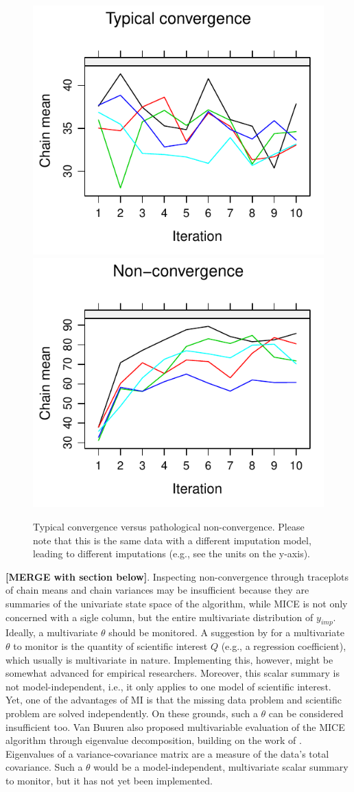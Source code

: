 \documentclass[Royal,times,sageh]{sagej}
\begin{document}
\begin{figure}

{\centering \includegraphics[width=.49\linewidth]{2.Manuscript_files/figure-latex/non-conv-1} \includegraphics[width=.49\linewidth]{2.Manuscript_files/figure-latex/non-conv-2} 

}

\caption{Typical convergence versus pathological non-convergence. Please note that this is the same data with a different imputation model, leading to different imputations (e.g., see the units on the y-axis).}\label{fig:non-conv}
\end{figure}

\textbf{{[}MERGE with section below{]}}. Inspecting non-convergence through traceplots of chain means and chain variances may be insufficient because they are summaries of the univariate state space of the algorithm, while MICE is not only concerned with a sigle column, but the entire multivariate distribution of \(y_{imp}\). Ideally, a multivariate \(\theta\) should be monitored. A suggestion by \citet{buur18} for a multivariate \(\theta\) to monitor is the quantity of scientific interest \(Q\) (e.g., a regression coefficient), which usually is multivariate in nature. Implementing this, however, might be somewhat advanced for empirical researchers. Moreover, this scalar summary is not model-independent, i.e., it only applies to one model of scientific interest. Yet, one of the advantages of MI is that the missing data problem and scientific problem are solved independently. On these grounds, such a \(\theta\) can be considered insufficient too. Van Buuren \citeyearpar[\(\S\) 4.5.2]{buur18} also proposed multivariable evaluation of the MICE algorithm through eigenvalue decomposition, building on the work of \citet{mack03}. Eigenvalues of a variance-covariance matrix are a measure of the data's total covariance. Such a \(\theta\) would be a model-independent, multivariate scalar summary to monitor, but it has not yet been implemented.
\end{document}
